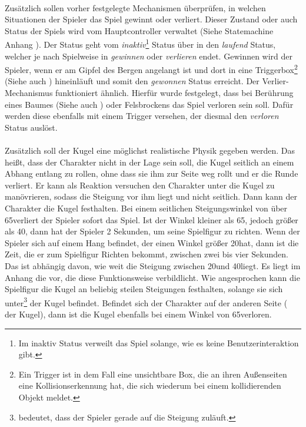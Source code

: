 \paragraph{}
Zusätzlich sollen vorher festgelegte Mechanismen überprüfen, in welchen Situationen der Spieler das Spiel gewinnt oder verliert. Dieser Zustand oder auch Status der Spiels wird vom Hauptcontroller verwaltet (Siehe Statemachine Anhang ). Der Status geht vom \textit{inaktiv}\footnote{Im inaktiv Status verweilt das Spiel solange, wie es keine Benutzerinteraktion gibt.} Status über in den \textit{laufend} Status, welcher je nach Spielweise in \textit{gewinnen} oder \textit{verlieren} endet. Gewinnen wird der Spieler, wenn er am Gipfel des Bergen angelangt ist und dort in eine Triggerbox\footnote{Ein Trigger ist in dem Fall eine unsichtbare Box, die an ihren Außenseiten eine Kollisionserkennung hat, die sich wiederum bei einem kollidierenden Objekt meldet.} (Siehe auch  ) hineinläuft und somit den \textit{gewonnen} Status erreicht. Der Verlier-Mechanismus funktioniert ähnlich. Hierfür wurde festgelegt, dass bei Berührung eines Baumes (Siehe auch ) oder Felsbrockens das Spiel verloren sein soll. Dafür werden diese ebenfalls mit einem Trigger versehen, der diesmal den \textit{verloren} Status auslöst.
\paragraph{}
Zusätzlich soll der Kugel eine möglichst realistische Physik gegeben werden. Das heißt, dass der Charakter nicht in der Lage sein soll, die Kugel seitlich an einem Abhang entlang zu rollen, ohne dass sie ihm zur Seite weg rollt und er die Runde verliert. Er kann als Reaktion versuchen den Charakter unter die Kugel zu manövrieren, sodass die Steigung vor ihm liegt und nicht seitlich. Dann kann der Charakter die Kugel festhalten. Bei einem seitlichen Steigungswinkel von über 65\cc verliert der Spieler sofort das Spiel. Ist der Winkel kleiner als 65\cc, jedoch größer als 40\cc, dann hat der Spieler 2 Sekunden, um seine Spielfigur zu richten. Wenn der Spieler sich auf einem Hang befindet, der einen Winkel größer 20\cc hat, dann ist die Zeit, die er zum Spielfigur Richten bekommt, zwischen zwei bis vier Sekunden. Das ist abhängig davon, wie weit die Steigung zwischen 20\cc und 40\cc liegt. Es liegt im Anhang die  vor, die diese Funktionsweise verbildlicht. Wie angesprochen kann die Spielfigur die Kugel an beliebig steilen Steigungen festhalten, solange sie sich unter\footnote{ bedeutet, dass der Spieler gerade auf die Steigung zuläuft.} der Kugel befindet. Befindet sich der Charakter auf der anderen Seite ( der Kugel), dann ist die Kugel ebenfalls bei einem Winkel von 65\cc verloren.
